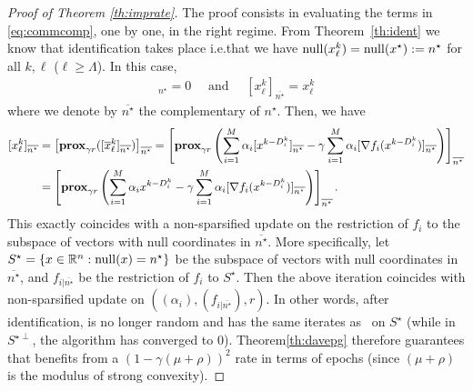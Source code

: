 \begin{proof}[Proof of Theorem \ref{th:imprate}]
The proof consists in evaluating the terms in \eqref{eq:commcomp}, one by one, in the right regime. 
From Theorem~\ref{th:ident} we know that identification takes place i.e.\;that we have $\mathrm{null}(x^k_\ell) = \mathrm{null}(x^\star) := n^\star$ for all $k,\ell$ ($\ell\geq\Lambda$).
In this case, 
\begin{align*}
    [x^k_\ell]_{n^\star} = 0 \quad\text{ and }\quad [x^k_\ell]_{\overline{n^\star}} = x_\ell^k
\end{align*}
where we denote by $\overline{n^\star}$ the complementary of $n^\star$. Then, we have
\begin{align*}
  \nonumber   [x^k_\ell]_{\overline{n^\star}}  
  &=\left[\mathbf{prox}_{\gamma r}([\overline{x}^k_\ell]_{\overline{n^\star}})\right]_{\overline{n^\star}}  
  = \left[\mathbf{prox}_{\gamma r}\left(\sum_{i=1}^M \alpha_i [x^{k-D_i^k}]_{\overline{n^\star}} - \gamma \sum_{i=1}^M \alpha_i [\nabla f_i(x^{k-D_i^k})]_{\overline{n^\star}} \right)\right]_{\overline{n^\star}} \\
     &=  \left[\mathbf{prox}_{\gamma r}\left(\sum_{i=1}^M \alpha_i x^{k-D_i^k} - \gamma \sum_{i=1}^M \alpha_i [\nabla f_i(x^{k-D_i^k})]_{\overline{n^\star}} \right)\right]_{\overline{n^\star}}.
\end{align*}
This exactly coincides with a non-sparsified update on the restriction of $f_i$ to the subspace of vectors with null coordinates in ${\overline{n^\star}}$. More specifically, let $S^\star = \{ x\in \mathbb{R}^n : \mathrm{null}(x) = n^\star \}$ be the subspace of vectors with null coordinates in ${\overline{n^\star}}$, and
$f_{i|{\overline{n^\star}}}$ be the restriction of $f_i$ to $S^\star$.
Then the above iteration coincides with non-sparsified update on
$((\alpha_i),(f_{i|{\overline{n^\star}}}),r)$. In other words, after identification, \salgo is no longer random and has the same iterates as \dave~on $S^\star$ (while in $S^{\star\perp}$, the algorithm has converged to $0$). Theorem\;\ref{th:davepg} therefore guarantees that \salgo benefits from a $(1-\gamma (\mu+\rho))^2$ rate in terms of epochs (since $(\mu+\rho)$ is the modulus of strong convexity).
\end{proof}

